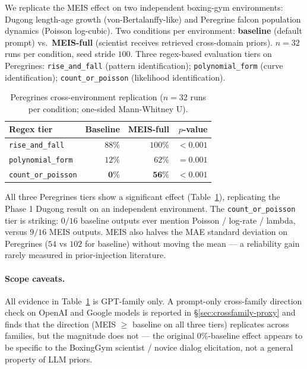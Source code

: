 \documentclass{article}
\begin{document}
We replicate the MEIS effect on two independent boxing-gym
environments: Dugong length-age growth (von-Bertalanffy-like) and
Peregrine falcon population dynamics (Poisson log-cubic). Two
conditions per environment: \textbf{baseline} (default prompt) vs.\
\textbf{MEIS-full} (scientist receives retrieved cross-domain
priors). $n = 32$ runs per condition, seed stride $100$. Three
regex-based evaluation tiers on Peregrines: \texttt{rise\_and\_fall}
(pattern identification); \texttt{polynomial\_form} (curve
identification); \texttt{count\_or\_poisson} (likelihood
identification).

\begin{table}[h]
\centering
\caption{Peregrines cross-environment replication
($n = 32$ runs per condition; one-sided Mann-Whitney U).}
\label{tab:crossenv}
\begin{tabular}{lrrr}
\toprule
Regex tier & Baseline & MEIS-full & $p$-value \\
\midrule
\texttt{rise\_and\_fall}    & $88\%$ & $100\%$ & $< 0.001$ \\
\texttt{polynomial\_form}   & $12\%$ & $62\%$  & $= 0.001$ \\
\texttt{count\_or\_poisson} & $\mathbf{0\%}$ & $\mathbf{56\%}$ & $\mathbf{< 0.001}$ \\
\bottomrule
\end{tabular}
\end{table}

All three Peregrines tiers show a significant effect
(Table~\ref{tab:crossenv}), replicating the Phase 1 Dugong result on
an independent environment. The \texttt{count\_or\_poisson} tier is
striking: $0 / 16$ baseline outputs ever mention
Poisson / log-rate / lambda, versus $9 / 16$ MEIS outputs. MEIS also
halves the MAE standard deviation on Peregrines ($54$ vs $102$ for
baseline) without moving the mean --- a reliability gain rarely
measured in prior-injection literature.

\paragraph{Scope caveats.} All evidence in
Table~\ref{tab:crossenv} is GPT-family only. A prompt-only
cross-family direction check on OpenAI and Google models is reported
in \S\ref{sec:crossfamily-proxy} and finds that the direction (MEIS
$\geq$ baseline on all three tiers) replicates across families, but
the magnitude does not --- the original $0\%$-baseline effect appears
to be specific to the BoxingGym scientist / novice dialog
elicitation, not a general property of LLM priors.
\end{document}
